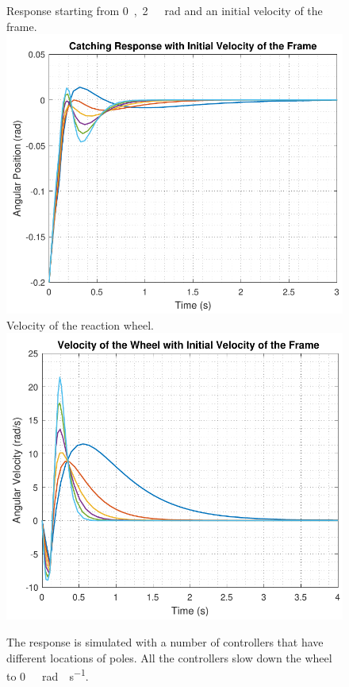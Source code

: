 \begin{figure}[H]
	\begin{minipage}{\linewidth}
		\captionsetup[subfigure]{font = footnotesize}
		\centering
		\subcaptionbox
		{
			Response starting from \si{0,2\ rad} and an initial velocity of the frame.
			\label{catchingStateSpace}
		}
		{
			\includegraphics[scale=.55]{figures/catchingStateSpace}
		}\quad
		\subcaptionbox
		{
			Velocity of the reaction wheel.
			\label{catchingStateSpaceWheel}
		}
		{
			\includegraphics[scale=.55]{figures/catchingStateSpaceWheel}
		}
		\caption{The response is simulated with a number of controllers that have different locations of poles. All the controllers slow down the wheel to \si{0\ rad \cdot s^{-1}}.}
		\label{catchingStateSpaceFrameAndWheel}
	\end{minipage}
\end{figure}
